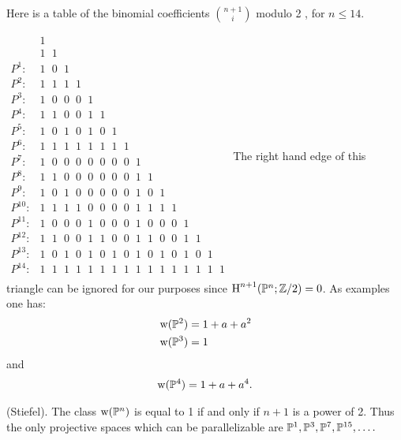 \documentclass[../main]{subfiles}
\begin{document}
Here is a table of the binomial coefficients $\binom{n+1}{i}$ modulo 2 , for $n \leq 14$.

{
\newcommand{\hs}{\hspace{7pt}}
$
\begin{array}{lc}
         & 1 \\
         & 1 \hs 1 \\
 P^1:    & 1 \hs 0 \hs 1 \\
 P^2:    & 1 \hs 1 \hs 1 \hs 1 \\
 P^3:    & 1 \hs 0 \hs 0 \hs 0 \hs 1 \\
 P^4:    & 1 \hs 1 \hs 0 \hs 0 \hs 1 \hs 1 \\
 P^5:    & 1 \hs 0 \hs 1 \hs 0 \hs 1 \hs 0 \hs 1 \\
 P^6:    & 1 \hs 1 \hs 1 \hs 1 \hs 1 \hs 1 \hs 1 \hs 1 \\
 P^7:    & 1 \hs 0 \hs 0 \hs 0 \hs 0 \hs 0 \hs 0 \hs 0 \hs 1 \\
 P^8:    & 1 \hs 1 \hs 0 \hs 0 \hs 0 \hs 0 \hs 0 \hs 0 \hs 1 \hs 1 \\
 P^9:    & 1 \hs 0 \hs 1 \hs 0 \hs 0 \hs 0 \hs 0 \hs 0 \hs 1 \hs 0 \hs 1 \\
 P^{10}: & 1 \hs 1 \hs 1 \hs 1 \hs 0 \hs 0 \hs 0 \hs 0 \hs 1 \hs 1 \hs 1 \hs 1 \\
 P^{11}: & 1 \hs 0 \hs 0 \hs 0 \hs 1 \hs 0 \hs 0 \hs 0 \hs 1 \hs 0 \hs 0 \hs 0 \hs 1 \\
 P^{12}: & 1 \hs 1 \hs 0 \hs 0 \hs 1 \hs 1 \hs 0 \hs 0 \hs 1 \hs 1 \hs 0 \hs 0 \hs 1 \hs 1 \\
 P^{13}: & 1 \hs 0 \hs 1 \hs 0 \hs 1 \hs 0 \hs 1 \hs 0 \hs 1 \hs 0 \hs 1 \hs 0 \hs 1 \hs 0 \hs 1 \\
 P^{14}: & 1 \hs 1 \hs 1 \hs 1 \hs 1 \hs 1 \hs 1 \hs 1 \hs 1 \hs 1 \hs 1 \hs 1 \hs 1 \hs 1 \hs 1 \hs 1 \\
\end{array}
$
}
\phantom{,}\newline\phantom{,}\newline
The right hand edge of this triangle can be ignored for our purposes since $\operatorname{H}^{n+1}(\mathbb{P}^{n}; \mathbb{Z} / 2)=0$. As examples one has:
\[
\begin{aligned}
&\operatorname{w}(\mathbb{P}^{2})=1+a+a^{2} \\
&\operatorname{w}(\mathbb{P}^{3})=1
\end{aligned}
\]
and
\[
\begin{aligned}
\operatorname{w}(\mathbb{P}^{4})=1+a+a^{4}.
\end{aligned}
\]
\begin{corollary} (Stiefel).
 The class $\operatorname{w}(\mathbb{P}^{n})$ is equal to 1 if and only if $n+1$ is a power of 2. Thus the only projective spaces which can be parallelizable are $\mathbb{P}^{1}, \mathbb{P}^{3}, \mathbb{P}^{7}, \mathbb{P}^{15}, \ldots .$
\end{corollary}
\end{document}
